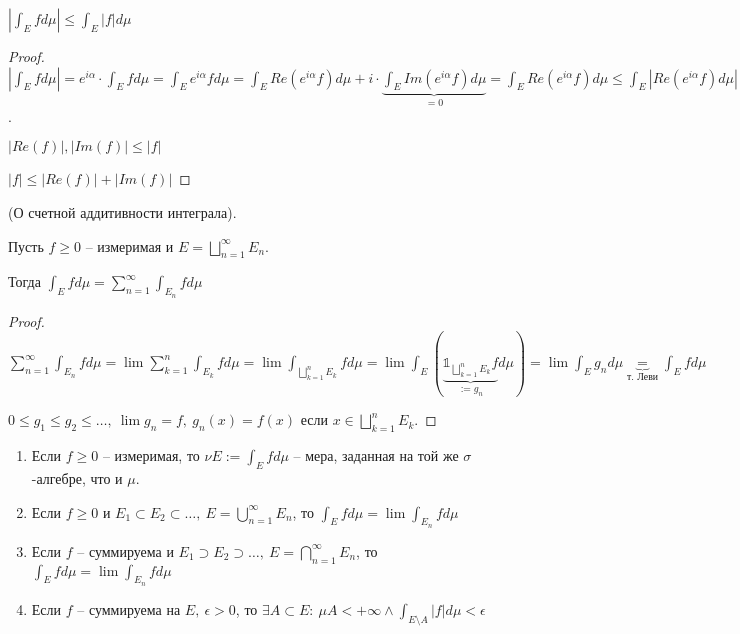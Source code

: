 \begin{remark}
    $\left|\int_E{f d \mu}\right| \leq \int_E{|f| d \mu}$
\end{remark}
\begin{proof}
    $\left| \int_E{f d \mu} \right| = e^{i \alpha} \cdot \int_E{f d \mu} = \int_E{e^{i \alpha} f d \mu} = \int_E{Re(e^{i \alpha} f) d \mu} + i \cdot \underbrace{\int_E{Im(e^{i \alpha}f) d \mu}}_{= 0} = \int_E{Re(e^{i \alpha}f) d \mu} \leq \int_E{\left| Re(e^{i \alpha} f) d \mu \right|} \leq \int_E{\left| e^{i \alpha}\right|  d \mu } = \int_E{|f| d \mu}$.

    $|Re(f)|, |Im(f)| \leq |f|$
    
    $|f| \leq |Re(f)| + |Im(f)|$
\end{proof}

\begin{theorem}
    (О счетной аддитивности интеграла).

    Пусть $f \geq 0$ -- измеримая и $E = \bigsqcup_{n=1}^{\infty} E_n$.
    
    Тогда $\int_E{f d \mu} = \sum_{n=1}^{\infty} \int_{E_n}{f d \mu}$
\end{theorem}
\begin{proof}
    $\sum_{n=1}^{\infty} \int_{E_n}{f d \mu} = \lim{\sum_{k=1}^{n} \int_{E_k}{f d \mu}} = \lim{\int_{\bigsqcup_{k=1}^{n} E_k}{f d \mu}} = \lim{\int_E\left({\underbrace{\mathbb{1}_{\bigsqcup_{k=1}^{n} E_k} f}_{:= g_n} d \mu}\right)} = \lim{\int_E{g_n d \mu}} \underbrace{=}_{\text{т. Леви}} \int_E{f d \mu}$

    $0 \leq g_1 \leq g_2 \leq \dots , \ \lim{g_n} = f, \ g_n(x) = f(x)$ если $x \in \bigsqcup_{k=1}^{n}E_k$.
\end{proof}

\begin{consequence}
    \begin{enumerate}
        \item Если $f \geq 0$ -- измеримая, то $\nu E := \int_E{f d \mu}$ -- мера, заданная на той же $\sigma$-алгебре, что и $\mu$.
        \item Если $f \geq 0$ и $E_1 \subset E_2 \subset \dots, \ E = \bigcup_{n=1}^{\infty}E_n$, то $\int_E{f d \mu} = \lim{\int_{E_n}{f d \mu}}$
        \item Если $f$ -- суммируема и $E_1 \supset E_2 \supset \dots, \ E = \bigcap_{n=1}^{\infty} E_n$, то $\int_E{f d \mu} = \lim{\int_{E_n}{f d \mu}}$
        \item Если $f$ -- суммируема на $E, \ \epsilon > 0$, то $\exists A \subset E:\ \mu A < +\infty \land \int_{E \setminus A}{|f| d \mu} < \epsilon$
    \end{enumerate}
\end{consequence}

